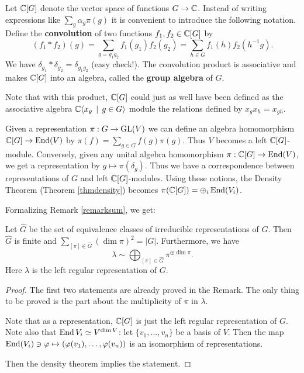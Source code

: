 \documentclass[11pt, english]{article}
\begin{document}
Let $\mathbb{C}[G]$ denote the vector space of functions $G \to \mathbb{C}$. Instead of writing expressions like $\sum_g \alpha_g \pi(g)$ it is convenient to introduce the following notation. Define the \textbf{convolution} of two functions $f_1,f_2 \in \mathbb{C}[G]$ by
$$
(f_1 \ast f_2)(g) = \sum_{g=g_1g_2} f_1(g_1)f_2(g_2) = \sum_{h \in G} f_1(h)f_2(h^{-1}g).
$$
We have $\delta_{g_1} \ast \delta_{g_2} = \delta_{g_1g_2}$ (easy check!). The convolution product is associative and makes $\mathbb{C}[G]$ into an algebra, called the \textbf{group algebra} of $G$.

Note that with this product, $\mathbb{C}[G]$ could just as well have been defined as the associative algebra $\mathbb{C}\langle x_g  \, \mid \, g \in G \rangle $ module the relations defined by $x_gx_h = x_{gh}$. 

Given a representation $\pi:G \to \operatorname{GL}(V)$ we can define an algebra homomorphism $\mathbb{C}[G] \to \operatorname{End}(V)$ by $\pi(f) = \sum_{g \in G} f(g) \pi(g)$. Thus $V$ becomes a left $\mathbb{C}[G]$-module. Conversely, given any unital algebra homomorphism $\pi:\mathbb{C}[G] \to \operatorname{End}(V)$, we get a representation by $g \mapsto \pi(\delta_g)$. Thus we have a correspondence between representations of $G$ and left $\mathbb{C}[G]$-modules. Using these notions, the Density Theorem (Theorem \ref{thmdensity}) becomes $\pi(\mathbb{C}[G]) = \oplus_i \operatorname{End}(V_i)$.

Formalizing Remark \ref{remarksum}, we get:

\begin{thm}
Let $\widehat G$ be the set of equivalence classes of irreducible representations of $G$. Then $\widehat G$ is finite and $\sum_{[\pi] \in \widehat G} (\dim \pi)^2 = \lvert G \rvert$. Furthermore, we have
$$
\lambda \sim  \bigoplus_{[\pi] \in \widehat G} \pi^{\oplus \dim \pi}.
$$
Here $\lambda$ is the left regular representation of $G$.
\end{thm}
\begin{proof}
The first two statements are already proved in the Remark. The only thing to be proved is the part about the multiplicity of $\pi$ in $\lambda$. 

Note that as a representation, $\mathbb{C}[G]$ is just the left regular representation of $G$. Note also that $\operatorname{End} V_i \simeq V^{\dim V}$: let $\{ v_1, \ldots , v_n\}$ be a basis of $V$. Then the map $\operatorname{End}(V_i) \ni \varphi \mapsto (\varphi(v_1), \ldots, \varphi(v_n))$ is an isomorphism of representations. 

Then the density theorem implies the statement.
\end{proof}
\end{document}
